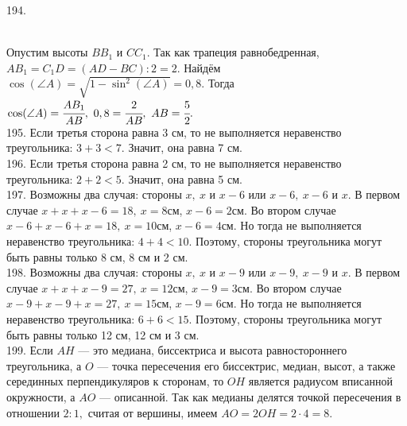 \documentclass[12pt]{article}
\begin{document}
194. \begin{figure}[ht!]
\end{figure}\\
Опустим высоты $BB_1$ и $CC_1.$ Так как трапеция равнобедренная, $AB_1=C_1D=(AD-BC):2=2.$ Найдём $\cos(\angle A)=\sqrt{1-\sin^2(\angle A)}=0,8.$ Тогда
$\cos(\angle A)=\cfrac{AB_1}{AB},\ 0,8=\cfrac{2}{AB},\ AB=\cfrac{5}{2}.$\\
195. Если третья сторона равна 3 см, то не выполняется неравенство треугольника: $3+3<7.$ Значит, она равна 7 см.\\
196. Если третья сторона равна 2 см, то не выполняется неравенство треугольника: $2+2<5.$ Значит, она равна 5 см.\\
197. Возможны два случая: стороны $x,\ x$ и $x-6$ или $x-6,\ x-6$ и $x.$ В первом случае $x+x+x-6=18,\ x=8$см, $x-6=2$см. Во втором случае $x-6+x-6+x=18,\ x=10$см, $x-6=4$см. Но тогда не выполняется неравенство треугольника: $4+4<10.$ Поэтому, стороны треугольника могут быть равны только 8 см, 8 см и 2 см.\\
198. Возможны два случая: стороны $x,\ x$ и $x-9$ или $x-9,\ x-9$ и $x.$ В первом случае $x+x+x-9=27,\ x=12$см, $x-9=3$см. Во втором случае $x-9+x-9+x=27,\ x=15$см, $x-9=6$см. Но тогда не выполняется неравенство треугольника: $6+6<15.$ Поэтому, стороны треугольника могут быть равны только 12 см, 12 см и 3 см.\\
199. Если $AH$ --- это медиана, биссектриса и высота равностороннего треугольника, а $O$ --- точка пересечения его биссектрис, медиан, высот, а также серединных перпендикуляров к сторонам, то $OH$ является радиусом вписанной окружности, а $AO$ --- описанной. Так как медианы делятся точкой пересечения в отношении $2:1,$ считая от вершины, имеем $AO=2OH=2\cdot4=8.$\\
\end{document}
